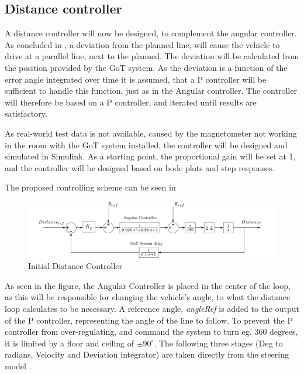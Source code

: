 \subsection{Distance controller}
A distance controller will now be designed, to complement the angular controller.
As concluded in , a deviation from the planned line, will cause the vehicle to drive at a parallel line, next to the planned. The deviation will be calculated from the position provided by the GoT system. As the deviation is a function of the error angle integrated over time it is assumed, that a P controller will be sufficient to handle this function, just as in the Angular controller. The controller will therefore be based on a P controller, and iterated until results are satisfactory. 

As real-world test data is not available, caused by the magnetometer not working in the room with the GoT system installed, the controller will be designed and simulated in Simulink. As a starting point, the proportional gain will be set at 1, and the controller will be designed based on bode plots and step responses.

The proposed controlling scheme can be seen in 

\begin{figure}[H]
\centering
\includegraphics[width=\textwidth]{figures/steeringFullModel.pdf} 
\caption{Initial Distance Controller}
\label{SteeringSimulink}
\end{figure}
As seen in the figure, the Angular Controller is placed in the center of the loop, as this will be responsible for changing the vehicle's angle, to what the distance loop calculates to be necessary. A reference angle, \emph{angleRef} is added to the output of the P controller, representing the angle of the line to follow. To prevent the P controller from over-regulating, and command the system to turn eg. 360 degrees, it is limited by a floor and ceiling of $\pm 90^\circ$. The following three stages (Deg to radians, Velocity and Deviation integrator) are taken directly from the steering model .

